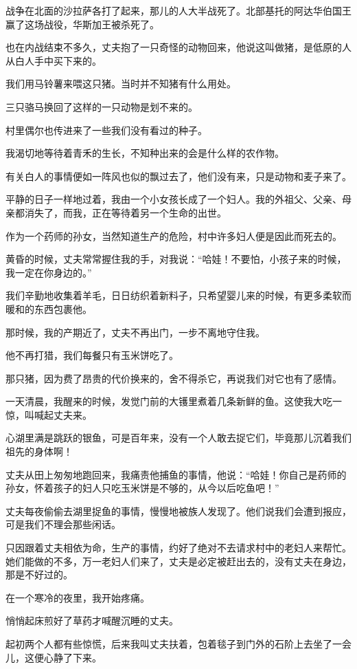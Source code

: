 \par 战争在北面的沙拉萨各打了起来，那儿的人大半战死了。北部基托的阿达华伯国王赢了这场战役，华斯加王被杀死了。
\par 也在内战结束不多久，丈夫抱了一只奇怪的动物回来，他说这叫做猪，是低原的人从白人手中买下来的。
\par 我们用马铃薯来喂这只猪。当时并不知猪有什么用处。
\par 三只骆马换回了这样的一只动物是划不来的。
\par 村里偶尔也传进来了一些我们没有看过的种子。
\par 我渴切地等待着青禾的生长，不知种出来的会是什么样的农作物。
\par 有关白人的事情便如一阵风也似的飘过去了，他们没有来，只是动物和麦子来了。
\par 平静的日子一样地过着，我由一个小女孩长成了一个妇人。我的外祖父、父亲、母亲都消失了，而我，正在等待着另一个生命的出世。
\par 作为一个药师的孙女，当然知道生产的危险，村中许多妇人便是因此而死去的。
\par 黄昏的时候，丈夫常常握住我的手，对我说：“哈娃！不要怕，小孩子来的时候，我一定在你身边的。”
\par 我们辛勤地收集着羊毛，日日纺织着新料子，只希望婴儿来的时候，有更多柔软而暖和的东西包裹他。
\par 那时候，我的产期近了，丈夫不再出门，一步不离地守住我。
\par 他不再打猎，我们每餐只有玉米饼吃了。
\par 那只猪，因为费了昂贵的代价换来的，舍不得杀它，再说我们对它也有了感情。
\par 一天清晨，我醒来的时候，发觉门前的大镬里煮着几条新鲜的鱼。这使我大吃一惊，叫喊起丈夫来。
\par 心湖里满是跳跃的银鱼，可是百年来，没有一个人敢去捉它们，毕竟那儿沉着我们祖先的身体啊！
\par 丈夫从田上匆匆地跑回来，我痛责他捕鱼的事情，他说：“哈娃！你自己是药师的孙女，怀着孩子的妇人只吃玉米饼是不够的，从今以后吃鱼吧！”
\par 丈夫每夜偷偷去湖里捉鱼的事情，慢慢地被族人发现了。他们说我们会遭到报应，可是我们不理会那些闲话。
\par 只因跟着丈夫相依为命，生产的事情，约好了绝对不去请求村中的老妇人来帮忙。她们能做的不多，万一老妇人们来了，丈夫是必定被赶出去的，没有丈夫在身边，那是不好过的。
\par 在一个寒冷的夜里，我开始疼痛。
\par 悄悄起床煎好了草药才喊醒沉睡的丈夫。
\par 起初两个人都有些惊慌，后来我叫丈夫扶着，包着毯子到门外的石阶上去坐了一会儿，这便心静了下来。
